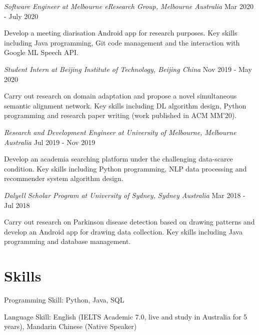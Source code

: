 \documentclass[letterpaper,11pt]{article}
\begin{document}
\textit{Software Engineer at Melbourne eResearch Group, Melbourne Australia} \hfill Mar 2020 - July 2020

Develop a meeting diarisation Android app for research purposes. Key skills including Java programming, Git code management and the interaction with Google ML Speech API. 

\vspace{9pt}

\textit{Student Intern at Beijing Institute of Technology, Beijing China} \hfill Nov 2019 - May 2020

Carry out research on domain adaptation and propose a novel simultaneous semantic alignment network. Key skills including DL algorithm design, Python programming and research paper writing (work published in ACM MM'20). 

\vspace{9pt}

\textit{Research and Development Engineer at University of Melbourne, Melbourne Australia} \hfill Jul 2019 - Nov 2019

Develop an academia searching platform under the challenging data-scarce condition. Key skills including Python programming, NLP data processing and recommender system algorithm design. 

\vspace{9pt}

\textit{Dalyell Scholar Program at University of Sydney, Sydney Australia} \hfill Mar 2018 - Jul 2018

Carry out research on Parkinson disease detection based on drawing patterns and develop an Android app for drawing data collection. Key skills including Java programming and database management. 

\vspace{1pt}

\section{Skills}
Programming Skill: Python, Java, SQL

Language Skill: English (IELTS Academic 7.0, live and study in Australia for 5 years), Mandarin Chinese (Native Speaker)
\end{document}
